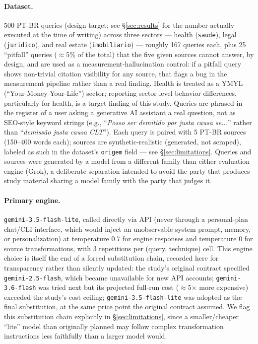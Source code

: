 \documentclass[11pt,a4paper]{article}
\begin{document}
\paragraph{Dataset.} 500 PT-BR queries (design target; see
\S\ref{sec:results} for the number actually executed at the time of
writing) across three sectors --- health (\texttt{saude}), legal
(\texttt{juridico}), and real estate (\texttt{imobiliario}) --- roughly 167
queries each, plus 25 ``pitfall'' queries ($\approx$5\% of the total) that
the five given sources cannot answer, by design, and are used as a
measurement-hallucination control: if a pitfall query shows non-trivial
citation visibility for any source, that flags a bug in the measurement
pipeline rather than a real finding. Health is treated as a YMYL
(``Your-Money-Your-Life'') sector; reporting sector-level behavior
differences, particularly for health, is a target finding of this study.
Queries are phrased in the register of a user asking a generative AI
assistant a real question, not as SEO-style keyword strings (e.g.,
``\emph{Posso ser demitido por justa causa se...}'' rather than
``\emph{demissão justa causa CLT}''). Each query is paired with 5 PT-BR
sources (150--400 words each); sources are synthetic-realistic (generated,
not scraped), labeled as such in the dataset's \texttt{origem} field --- see
\S\ref{sec:limitations}. Queries and sources were generated by a model from
a different family than either evaluation engine (Grok), a deliberate
separation intended to avoid the party that produces study material sharing
a model family with the party that judges it.

\paragraph{Primary engine.} \texttt{gemini-3.5-flash-lite}, called directly
via API (never through a personal-plan chat/CLI interface, which would
inject an unobservable system prompt, memory, or personalization) at
temperature 0.7 for engine responses and temperature 0 for source
transformations, with 3 repetitions per (query, technique) cell. This
engine choice is itself the end of a forced substitution chain, recorded
here for transparency rather than silently updated: the study's original
contract specified \texttt{gemini-2.5-flash}, which became unavailable for
new API accounts; \texttt{gemini-3.6-flash} was tried next but its
projected full-run cost ($\approx$5$\times$ more expensive) exceeded the
study's cost ceiling; \texttt{gemini-3.5-flash-lite} was adopted as the
final substitution, at the same price point the original contract assumed.
We flag this substitution chain explicitly in \S\ref{sec:limitations},
since a smaller/cheaper ``lite'' model than originally planned may follow
complex transformation instructions less faithfully than a larger model
would.
\end{document}
